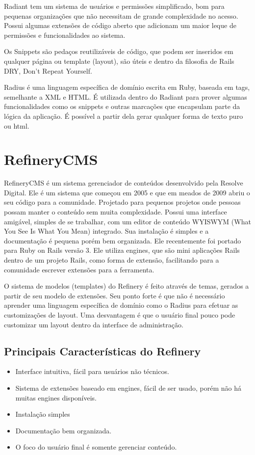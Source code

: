 Radiant tem um sistema de usuários e permissões simplificado, bom para pequenas organizações que não necessitam de grande complexidade no acesso. Possui algumas extensões de código aberto que adicionam um maior leque de permissões e funcionalidades ao sistema.

Os Snippets são pedaços reutilizáveis de código, que podem ser inseridos em qualquer página ou template (layout), são úteis e dentro da filosofia de Rails DRY, Don't Repeat Yourself. 

Radius é uma linguagem específica de domínio escrita em Ruby, baseada em tags, semelhante a XML e HTML. É utilizada dentro do Radiant para prover algumas funcionalidades como os snippets e outras marcações que encapsulam parte da lógica da aplicação. É possível a partir dela gerar qualquer forma de texto puro ou html. 

\section{RefineryCMS}

RefineryCMS é um sistema gerenciador de conteúdos desenvolvido pela Resolve Digital. Ele é um sistema que começou em 2005 e que em meados de 2009 abriu o seu código para a comunidade. Projetado para pequenos projetos onde pessoas possam manter o conteúdo sem muita complexidade. Possui uma interface amigável, simples de se trabalhar, com um editor de conteúdo WYISWYM (What You See Is What You Mean) integrado. Sua instalação é simples e a documentação é pequena porém bem organizada. Ele recentemente foi portado para  Ruby on Rails versão 3. Ele utiliza engines, que são mini aplicações Rails dentro de um projeto Rails, como forma de extensão, facilitando para a comunidade escrever extensões para a ferramenta. 

O sistema de modelos (templates) do Refinery é feito através de temas, gerados a partir de seu modelo de extensões. Seu ponto forte é que não é necessário aprender uma linguagem específica de domínio como o Radius para efetuar as customizações de layout. Uma desvantagem é que o usuário final pouco pode customizar um layout dentro da interface de administração.

\subsection{Principais Características do Refinery}

\begin{itemize}
  \item Interface intuitiva, fácil para usuários não técnicos.
  \item Sistema de extensões baseado em engines, fácil de ser usado, porém não há muitas engines disponíveis.
  \item Instalação simples
  \item Documentação bem organizada.
  \item O foco do usuário final é somente gerenciar conteúdo.
\end{itemize}

